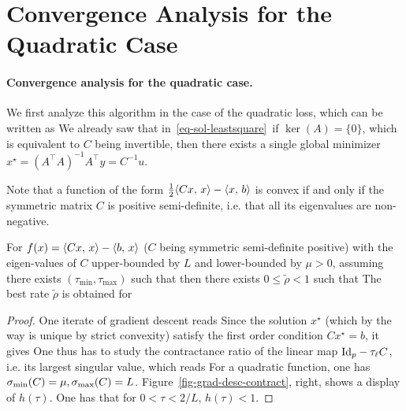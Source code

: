 \section{Convergence Analysis for the Quadratic Case}

\paragraph{Convergence analysis for the quadratic case.}

We first analyze this algorithm in the case of the quadratic loss, which can be written as
We already saw that in~\eqref{eq-sol-leastsquare} if $\ker(A)=\{0\}$, which is equivalent to $C$ being invertible, then there exists a single global minimizer $x^\star = (A^\top A)^{-1} A^\top y = C^{-1} u$. 

Note that a function of the form $\frac{1}{2} \langle Cx,\,x\rangle - \langle x,\,b\rangle$ is convex if and only if the symmetric matrix $C$ is positive semi-definite, i.e. that all its eigenvalues are non-negative. 

\begin{prop}\label{prop-graddesc-quad}
	For $f(x)=\langle Cx,\,x\rangle-\langle b,\,x\rangle$ ($C$ being symmetric semi-definite positive) with the eigen-values of $C$ upper-bounded by $L$ and lower-bounded by $\mu>0$, assuming there exists $(\tau_{\min},\tau_{\max})$ such that
	then there exists $0 \leq \tilde\rho<1$ such that 
	The best rate $\tilde\rho$ is obtained for 
\end{prop}
\begin{proof}
	One iterate of gradient descent reads 
	Since the solution $x^\star$ (which by the way is unique by strict convexity) satisfy the first order condition $C x^\star=b$, it gives
	One thus has to study the contractance ratio of the linear map $\mathrm{Id}_p-\tau_\ell C$, i.e. its largest singular value, which reads
	For a quadratic function, one has $\sigma_{\min}(C) = \mu, \sigma_{\max}(C)=L$. Figure~\ref{fig-grad-desc-contract}, right, shows a display of $h(\tau)$. One has that for $0<\tau<2/L$, $h(\tau)<1$.
\end{proof}




